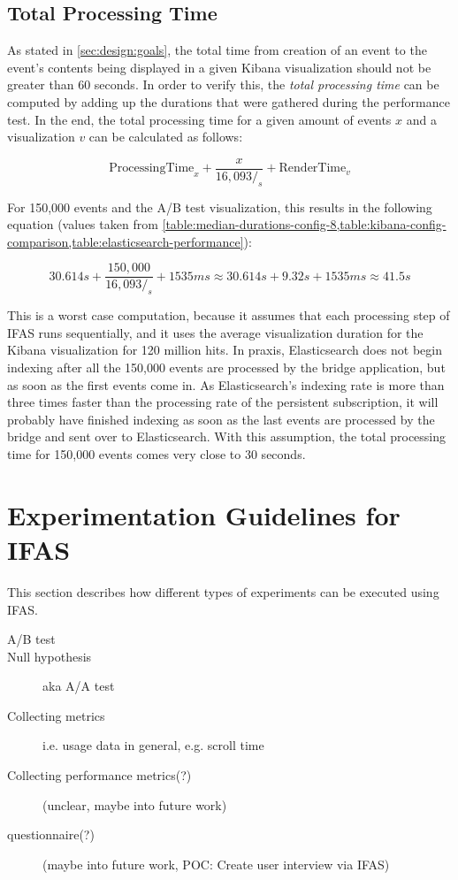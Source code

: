 \subsection{Total Processing Time}
\label{subsec:evaluation:performance:total-processing-time}

As stated in \cref{sec:design:goals}, the total time from creation of an event to the event's contents being displayed in a given Kibana visualization should not be greater than 60 seconds.
In order to verify this, the \emph{total processing time} can be computed by adding up the durations that were gathered during the performance test.
In the end, the total processing time for a given amount of events $x$ and a visualization $v$ can be calculated as follows:

$$ \text{ProcessingTime}_x + \frac{x}{16,093/_s} + \text{RenderTime}_v$$

For 150,000 events and the A/B test visualization, this results in the following equation (values taken from \cref{table:median-durations-config-8,table:kibana-config-comparison,table:elasticsearch-performance}):

$$ 30.614s + \frac{150,000}{16,093/_s} + 1535ms \approx 30.614s + 9.32s + 1535ms \approx 41.5s $$

This is a worst case computation, because it assumes that each processing step of \ac{IFAS} runs sequentially, and it uses the average visualization duration for the Kibana visualization for 120 million hits.
In praxis, Elasticsearch does not begin indexing after all the 150,000 events are processed by the bridge application, but as soon as the first events come in.
As Elasticsearch's indexing rate is more than three times faster than the processing rate of the persistent subscription, it will probably have finished indexing as soon as the last events are processed by the bridge and sent over to Elasticsearch.
With this assumption, the total processing time for 150,000 events comes very close to 30 seconds.

\section{Experimentation Guidelines for IFAS}

This section describes how different types of experiments can be executed using \ac{IFAS}.

\begin{description}
\item[A/B test]
\item[Null hypothesis] aka A/A test \cite{Kohavi2009}
\item[Collecting metrics] i.e. usage data in general, e.g. scroll time
\item[Collecting performance metrics(?)] (unclear, maybe into future work)
\item[questionnaire(?)] (maybe into future work, POC: Create user interview via \ac{IFAS})
\end{description}


